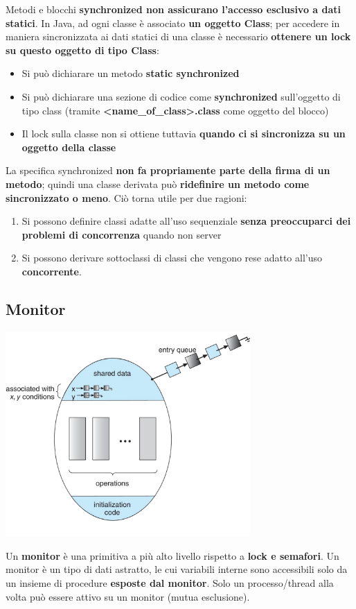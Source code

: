 \documentclass[12pt]{article}
\begin{document}
Metodi e blocchi \textbf{synchronized non assicurano l'accesso esclusivo a dati statici}. In Java, ad ogni classe è associato \textbf{un oggetto Class}; per accedere in maniera sincronizzata ai dati statici di una classe è necessario \textbf{ottenere un lock su questo oggetto di tipo Class}:
\begin{itemize}
    \item Si può dichiarare un metodo \textbf{static synchronized}
    \item Si può dichiarare una sezione di codice come \textbf{synchronized} sull'oggetto di tipo class (tramite \textbf{<name\_of\_class>.class} come oggetto del blocco)
    \item Il lock sulla classe non si ottiene tuttavia \textbf{quando ci si sincronizza su un oggetto della classe}
\end{itemize}
La specifica synchronized \textbf{non fa propriamente parte della firma di un metodo}; quindi una classe derivata può \textbf{ridefinire un metodo come sincronizzato o meno}. Ciò torna utile per due ragioni:
\begin{enumerate}
    \item Si possono definire classi adatte all'uso sequenziale \textbf{senza preoccuparci dei problemi di concorrenza} quando non server
    \item Si possono derivare sottoclassi di classi che vengono rese adatto all'uso \textbf{concorrente}.
\end{enumerate}
\subsection{Monitor}
\begin{center}
    \includegraphics[width = 0.70\textwidth]{Images/84.PNG}
\end{center}
Un \textbf{monitor} è una primitiva a più alto livello rispetto a \textbf{lock e semafori}. Un monitor è un tipo di dati astratto, le cui variabili interne sono accessibili solo da un insieme di procedure \textbf{esposte dal monitor}. Solo un processo/thread alla volta può essere attivo su un monitor (mutua esclusione).
\end{document}
